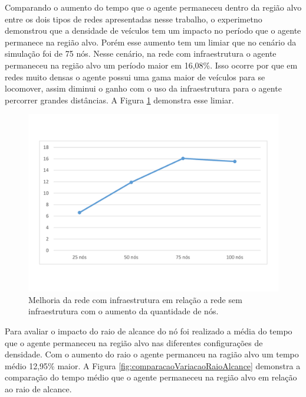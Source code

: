 Comparando o aumento do tempo que o agente permaneceu dentro da região alvo entre os dois tipos de redes apresentadas nesse trabalho, o experimetno demonstrou que a densidade de veículos tem um impacto no período que o agente permanece na região alvo. Porém esse aumento tem um limiar que no cenário da simulação foi de 75 nós. Nesse cenário, na rede com infraestrutura o agente permaneceu na região alvo um período maior em 16,08\%. Isso ocorre por que em redes muito densas o agente possui uma gama maior de veículos para se locomover, assim diminui o ganho com o uso da infraestrutura para o agente percorrer grandes distâncias. A Figura \ref{fig:comparacaoMelhoriaComVariacaoNos} demonstra esse limiar.  


\begin{figure}[htbp]
	\centering
	\includegraphics[scale=0.34]{resultados/graficos/comparacaoMelhoriaComVariacaoNos.pdf}
	\caption{Melhoria da rede com infraestrutura em relação a rede sem infraestrutura com o aumento da quantidade de nós.}
	\label{fig:comparacaoMelhoriaComVariacaoNos}
\end{figure}

Para avaliar o impacto do raio de alcance do nó foi realizado a média do tempo que o agente permaneceu na região alvo nas diferentes configurações de densidade. Com o aumento do raio o agente permanceu na ragião alvo um tempo médio 12,95\% maior. A Figura \ref{fig:comparacaoVariacaoRaioAlcance} demonstra a comparação do tempo médio que o agente permaneceu na região alvo em relação ao raio de alcance.

